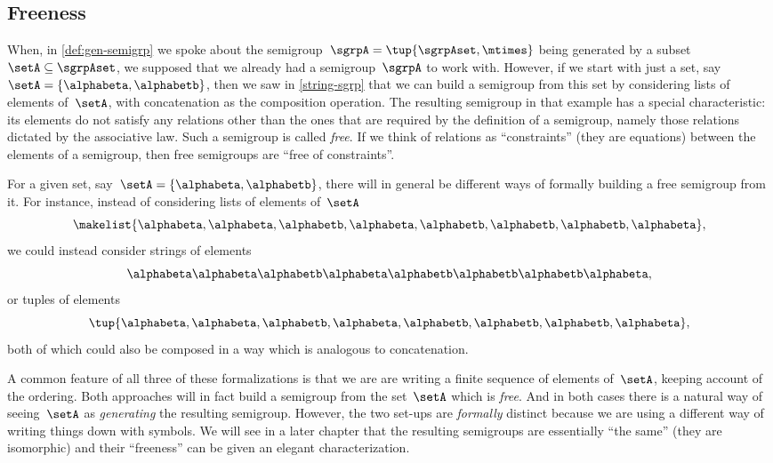 \subsection{Freeness}

When, in \cref{def:gen-semigrp} we spoke about the semigroup~$\sgrpA = \tup{\sgrpAset, \mtimes}$  being generated by a subset~$\setA \subseteq \sgrpAset$, we supposed that we already had a semigroup~$\sgrpA$ to work with.
However, if we start with just a set, say~$\setA = \{ \alphabeta, \alphabetb\}$, then we saw in \cref{string-sgrp} that we can build a semigroup from this set by considering lists of elements of~$\setA$, with concatenation as the composition operation.
The resulting semigroup in that example has a special characteristic: its elements do not satisfy any relations other than the ones that are required by the definition of a semigroup, namely those relations dictated by the associative law.
Such a semigroup is called \emph{free}.
If we think of relations as ``constraints'' (they are equations) between the elements of a semigroup, then free semigroups are ``free of constraints''.

For a given set, say~$\setA = \{ \alphabeta, \alphabetb\}$, there will in general be different ways of formally building a free semigroup from it.
For instance, instead of considering lists of elements of~$\setA$
\begin{equation}
    \makelist{\alphabeta,\alphabeta, \alphabetb, \alphabeta, \alphabetb, \alphabetb, \alphabetb, \alphabeta},
\end{equation}
we could instead consider strings of elements
\begin{equation}
    \alphabeta\alphabeta \alphabetb \alphabeta \alphabetb \alphabetb \alphabetb \alphabeta,
\end{equation}
or tuples of elements
\begin{equation}
    \tup{ \alphabeta, \alphabeta,  \alphabetb,  \alphabeta,  \alphabetb,  \alphabetb,  \alphabetb,  \alphabeta},
\end{equation}
both of which could also be composed in a way which is analogous to concatenation.

A common feature of all three of these formalizations is that we are are writing a finite sequence of elements of~$\setA$, keeping account of the ordering.
Both approaches will in fact build a semigroup from the set~$\setA$ which is \emph{free}.
And in both cases there is a natural way of seeing~$\setA$ as \emph{generating} the resulting semigroup.
However, the two set-ups are \emph{formally} distinct because we are using a different way of writing things down with symbols.
We will see in a later chapter that the resulting semigroups are essentially ``the same'' (they are isomorphic) and their ``freeness'' can be given an elegant characterization.

